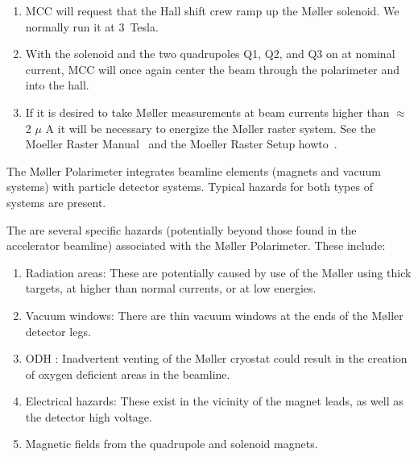 {\begin{enumerate}
        \item MCC will request that the Hall shift crew ramp up the
	M\o ller solenoid. We normally run it at 3~Tesla.

        \item With the solenoid and the two quadrupoles Q1, Q2, and Q3 on
              at nominal current, MCC will once again center the beam
              through the polarimeter and into the hall.

	\item If it is desired to take M\o ller measurements at beam currents
	      higher than $\approx$ 2 $\mu$ A it will be necessary to energize
	      the M\o ller raster system. See the Moeller Raster
              Manual~\cite{docdb:moellerraster} and the
              Moeller Raster Setup howto~\cite{howto:moeller_raster}.
\end{enumerate}




\begin{safetyen}{0}{0}
%
%

The M\o ller Polarimeter integrates beamline elements (magnets and
vacuum systems) with particle detector systems. Typical hazards for
both types of systems are present.


The are several specific hazards (potentially beyond those found in
the accelerator beamline) associated with the M\o ller Polarimeter.
These include:
\begin{enumerate}
\item{Radiation areas: These are potentially caused by use of the M\o ller using thick targets, at higher than normal currents, or at low energies.}
\item{Vacuum windows: There are thin vacuum windows at the ends of the M\o ller detector legs.}
\item{ODH : Inadvertent venting of the M\o ller cryostat could result in the creation of oxygen deficient areas in the beamline.}
\item{Electrical hazards: These exist in the vicinity of the magnet leads, as well as the detector high voltage.}
\item{Magnetic fields from the quadrupole and solenoid magnets.}
\end{enumerate}


\end{safetyen}}
